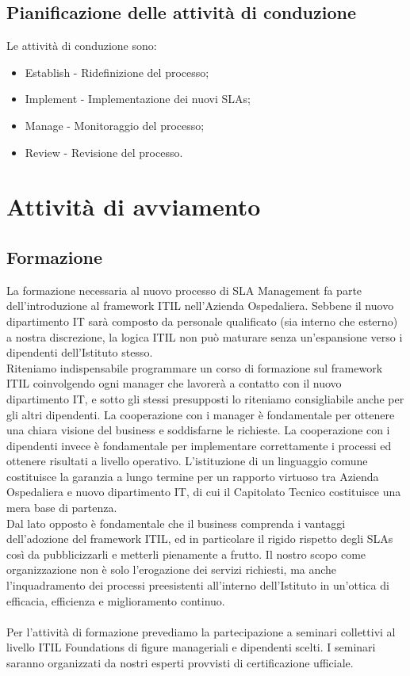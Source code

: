 \subsection{Pianificazione delle attività di conduzione}

Le attività di conduzione sono:

\begin{itemize}
	\item Establish - Ridefinizione del processo;
    \item Implement - Implementazione dei nuovi SLAs;
    \item Manage - Monitoraggio del processo;
    \item Review - Revisione del processo.
\end{itemize}


\section{Attività di avviamento}

\subsection{Formazione}

La formazione necessaria al nuovo processo di SLA Management fa parte dell'introduzione al framework ITIL nell'Azienda Ospedaliera. Sebbene il nuovo dipartimento IT sarà composto da personale qualificato (sia interno che esterno) a nostra discrezione, la logica ITIL non può maturare senza un'espansione verso i dipendenti dell'Istituto stesso. 
\\
Riteniamo indispensabile programmare un corso di formazione sul framework ITIL coinvolgendo ogni manager che lavorerà a contatto con il nuovo dipartimento IT, e sotto gli stessi presupposti lo riteniamo consigliabile anche per gli altri dipendenti. La cooperazione con i manager è fondamentale per ottenere una chiara visione del business e soddisfarne le richieste. La cooperazione con i dipendenti invece è fondamentale per implementare correttamente i processi ed ottenere risultati a livello operativo. L'istituzione di un linguaggio comune costituisce la garanzia a lungo termine per un rapporto virtuoso tra Azienda Ospedaliera e nuovo dipartimento IT, di cui il Capitolato Tecnico costituisce una mera base di partenza.
\\
Dal lato opposto è fondamentale che il business comprenda i vantaggi dell'adozione del framework ITIL, ed in particolare il rigido rispetto degli SLAs così da pubblicizzarli e metterli pienamente a frutto. Il nostro scopo come organizzazione non è solo l'erogazione dei servizi richiesti, ma anche l'inquadramento dei processi preesistenti all'interno dell'Istituto in un'ottica di efficacia, efficienza e miglioramento continuo.
\\ \\
Per l'attività di formazione prevediamo la partecipazione a seminari collettivi al livello ITIL Foundations di figure manageriali e dipendenti scelti. I seminari saranno organizzati da nostri esperti provvisti di certificazione ufficiale.

